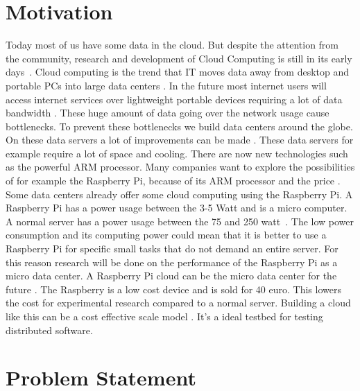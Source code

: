 \documentclass{sig-alternate-br}
\begin{document}
\section{Motivation}
Today most of us have some data in the cloud. But despite the attention from the community, research and development of Cloud Computing is still in its early days~\cite{tso:2013}. \newline
Cloud computing is  the trend that IT moves data away from desktop and portable PCs into large data centers \cite{dikaiakos:2009}. In the future most internet users will access internet services over lightweight portable devices requiring a lot of data bandwidth \cite{dikaiakos:2009}. These huge amount of data going over the network usage cause bottlenecks. To prevent these bottlenecks we build data centers around the globe. On these data servers a lot of improvements can be made \cite{bennett2007netflix,abrahamsson:2013,beloglazov:2010}. 
These data servers for example require a lot of space and cooling. There are now new technologies such as the powerful ARM processor. Many companies want to explore the possibilities of for example the Raspberry Pi, because of its ARM processor and the price \cite{Pcextreme}. Some data centers already offer some cloud computing using the Raspberry Pi. \newline
A Raspberry Pi has a power usage between the 3-5 Watt and is a micro computer. A normal server has a power usage between the 75 and 250 watt~\cite{Powerusage,beloglazov2012energy}. The low power consumption and its computing power could mean that it is better to use a Raspberry Pi for specific small tasks that do not demand an entire server. For this reason research will be done on the performance of the Raspberry Pi as a micro data center. \newline
A Raspberry Pi cloud can be the micro data center for the future \cite{tso:2013}. The Raspberry is a low cost device and is sold for 40 euro. This lowers the cost for experimental research compared to a normal server. Building a cloud like this can be a cost effective scale model \cite{tso:2013}. It's a ideal testbed for testing distributed software. 

\section{Problem Statement}
\end{document}
